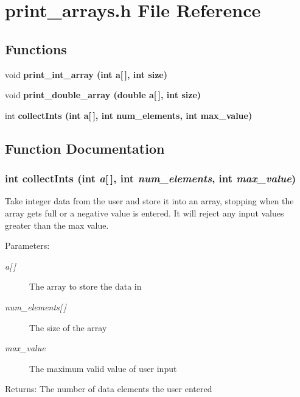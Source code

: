 \section{print\_\-arrays.h File Reference}
\label{print__arrays_8h}
\subsection*{Functions}
\begin{CompactItemize}
\item 
void \bf{print\_\-int\_\-array} (int a[$\,$], int size)
\item 
void \bf{print\_\-double\_\-array} (double a[$\,$], int size)
\item 
int \bf{collect\-Ints} (int a[$\,$], int num\_\-elements, int max\_\-value)
\end{CompactItemize}


\subsection{Function Documentation}
\subsubsection{\setlength{\rightskip}{0pt plus 5cm}int collect\-Ints (int {\em a}[$\,$], int {\em num\_\-elements}, int {\em max\_\-value})}\label{print__arrays_8h_3c48583ebe9f34d8bfee8a0f01243a48}


Take integer data from the user and store it into an array, stopping when the array gets full or a negative value is entered. It will reject any input values greater than the max value. \begin{Desc}
\item[Parameters:]
\begin{description}
\item[{\em a\mbox{[}$\,$\mbox{]}}]The array to store the data in \item[{\em num\_\-elements\mbox{[}$\,$\mbox{]}}]The size of the array \item[{\em max\_\-value}]The maximum valid value of user input \end{description}
\end{Desc}
\begin{Desc}
\item[Returns:]The number of data elements the user entered \end{Desc}
